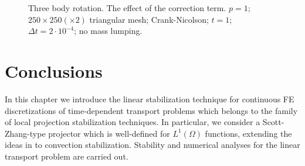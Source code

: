 \begin{figure}%
\centering
{}%
\caption{Three body rotation. The effect of the correction term. $p=1$; $250\times 250 (\times 2)$ triangular mesh; Crank-Nicolson; $t=1$; $\Delta t = 2 \cdot 10^{-4}$; no mass lumping.}\label{fig-square1}
\end{figure}

\section{Conclusions}\label{s-concl}
In this chapter we introduce the linear stabilization technique for continuous FE
discretizations of time-dependent transport problems which belongs to the family of local 
projection stabilization techniques. In particular, we consider a Scott-Zhang-type projector which is 
well-defined for $L^1(\Omega)$ functions, extending the ideas in \cite{badia_stabilized_2012} to convection stabilization. 
Stability and numerical analyses for the linear transport problem are carried out. 

